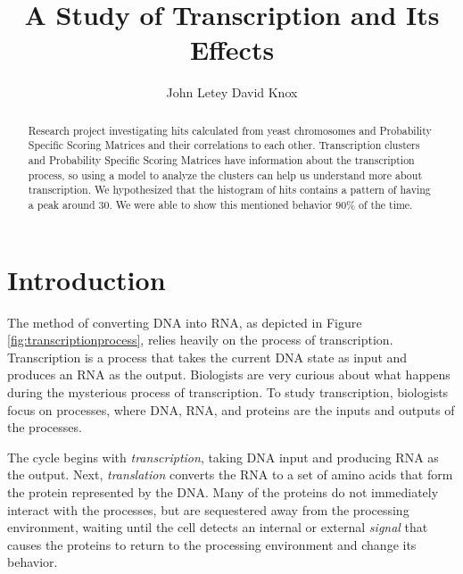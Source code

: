 \documentclass{article}
\title{A Study of Transcription and Its Effects}
\author{
  John Letey \And David Knox
}
\newcommand{\tab}{\hspace{9mm}}
\begin{document}
\maketitle

\begin{abstract}
  Research project investigating hits calculated from yeast chromosomes and Probability Specific Scoring Matrices and their correlations to each other. Transcription clusters and Probability Specific Scoring Matrices have information about the transcription process, so using a model to analyze the clusters can help us understand more about transcription. We hypothesized that the histogram of hits contains a pattern of having a peak around $30$. We were able to show this mentioned behavior $90$\% of the time.
\end{abstract}

\section{Introduction}
\tab The method of converting DNA into RNA, as depicted in Figure \ref{fig:transcriptionprocess}, relies heavily on the process of transcription. Transcription is a process that takes the current DNA state as input and produces an RNA as the output. Biologists are very curious about what happens during the mysterious process of transcription. To study transcription, biologists focus on processes, where DNA, RNA, and proteins are the inputs and outputs of the processes.

\tab The cycle begins with \textit{transcription}, taking DNA input and producing RNA as the output. Next, \textit{translation} converts the RNA to a set of amino acids that form the protein represented by the DNA. Many of the proteins do not immediately interact with the processes, but are sequestered away from the processing environment, waiting until the cell detects an internal or external \textit{signal} that causes the proteins to return to the processing environment and change its behavior.
\end{document}
